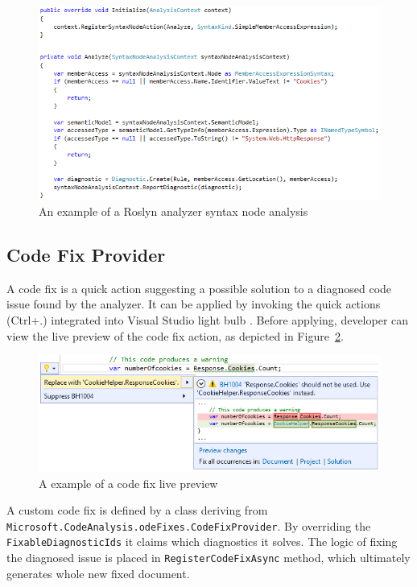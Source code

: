 \documentclass[
  digital, %
  table,   %
  lof,     %
  lot,     %
  oneside,
]{fithesis3}
\begin{document}
\begin{figure}[h!]
		\centering
			\includegraphics[scale=0.73]{img/analyzer-example}
		\caption{An example of a Roslyn analyzer syntax node analysis}
		\label{fig:analyzer-example}
\end{figure}

\subsection{Code Fix Provider}
A code fix is a quick action suggesting a possible solution to a diagnosed code issue found by the analyzer. It can be applied by invoking the quick actions (Ctrl+.) integrated into Visual Studio light bulb . Before applying, developer can view the live preview of the code fix action, as depicted in Figure~\ref{fig:codefix-example}.

\begin{figure}[h!]
		\centering
			\includegraphics[scale=0.75]{img/codefix-example}
		\caption{A example of a code fix live preview}
		\label{fig:codefix-example}
\end{figure}

A custom code fix is defined by a class deriving from \texttt{Microsoft.CodeAnalysis.odeFixes.CodeFixProvider}. By overriding the \texttt{FixableDiagnosticIds} it claims which diagnostics it solves. The logic of fixing the diagnosed issue is placed in \texttt{RegisterCodeFixAsync} method, which ultimately generates whole new fixed document.
\end{document}
